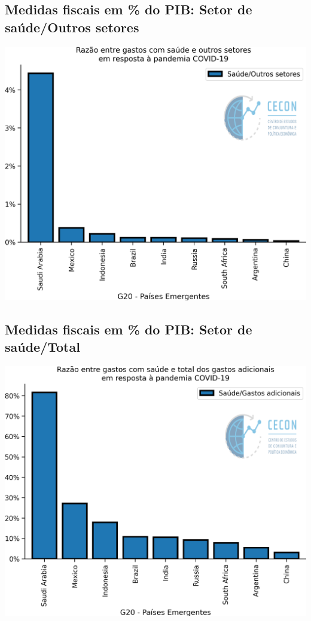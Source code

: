 \documentclass{SelfArx}
\begin{document}
\subsection*{Medidas fiscais em \% do PIB: Setor de saúde/Outros setores}
\label{sec:orgdb7acc7}

\begin{center}
\includegraphics[width=.9\linewidth]{./figs/IMF/FiscalMonitor_Covid_ratio.png}
\end{center}

\subsection*{Medidas fiscais em \% do PIB: Setor de saúde/Total}
\label{sec:org34c07e1}

\begin{center}
\includegraphics[width=.9\linewidth]{./figs/IMF/FiscalMonitor_Covid_total.png}
\end{center}
\end{document}

